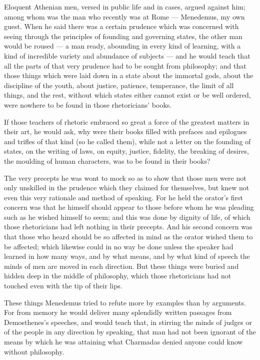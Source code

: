  Eloquent Athenian men, versed in public life and in cases, argued against him; among whom was the man who recently was at Rome — Menedemus, my own guest. When he said there was a certain prudence which was concerned with seeing through the principles of founding and governing states, the other man would be roused — a man ready, abounding in every kind of learning, with a kind of incredible variety and abundance of subjects — and he would teach that all the parts of that very prudence had to be sought from philosophy; and that those things which were laid down in a state about the immortal gods, about the discipline of the youth, about justice, patience, temperance, the limit of all things, and the rest, without which states either cannot exist or be well ordered, were nowhere to be found in those rhetoricians' books.

 If those teachers of rhetoric embraced so great a force of the greatest matters in their art, he would ask, why were their books filled with prefaces and epilogues and trifles of that kind (so he called them), while not a letter on the founding of states, on the writing of laws, on equity, justice, fidelity, the breaking of desires, the moulding of human characters, was to be found in their books?

 The very precepts he was wont to mock so as to show that those men were not only unskilled in the prudence which they claimed for themselves, but knew not even this very rationale and method of speaking. For he held the orator's first concern was that he himself should appear to those before whom he was pleading such as he wished himself to seem; and this was done by dignity of life, of which those rhetoricians had left nothing in their precepts. And his second concern was that those who heard should be so affected in mind as the orator wished them to be affected; which likewise could in no way be done unless the speaker had learned in how many ways, and by what means, and by what kind of speech the minds of men are moved in each direction. But these things were buried and hidden deep in the middle of philosophy, which those rhetoricians had not touched even with the tip of their lips.

 These things Menedemus tried to refute more by examples than by arguments. For from memory he would deliver many splendidly written passages from Demosthenes's speeches, and would teach that, in stirring the minds of judges or of the people in any direction by speaking, that man had not been ignorant of the means by which he was attaining what Charmadas denied anyone could know without philosophy.

